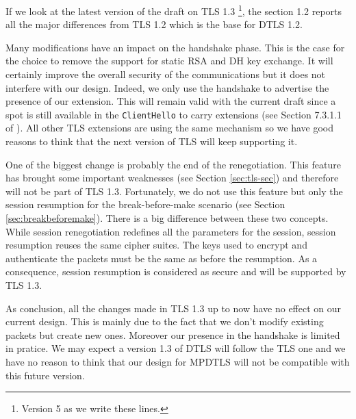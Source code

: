 If we look at the latest version of the draft on TLS 1.3 \cite{draft-tls13}\footnote{Version 5 as we write these lines.}, the section 1.2 reports all the major differences from TLS 1.2 which is the base for DTLS 1.2.

Many modifications have an impact on the handshake phase. This is the case for the choice to remove the support for static RSA and DH key exchange. It will certainly improve the overall security of the communications but it does not interfere with our design. Indeed, we only use the handshake to advertise the presence of our extension. This will remain valid with the current draft since a spot is still available in the \texttt{ClientHello} to carry extensions (see Section 7.3.1.1 of \cite{draft-tls13}). All other TLS extensions are using the same mechanism so we have good reasons to think that the next version of TLS will keep supporting it.

One of the biggest change is probably the end of the renegotiation. This feature has brought some important weaknesses (see Section \ref{sec:tls-sec}) and therefore will not be part of TLS 1.3. Fortunately, we do not use this feature but only the session resumption for the break-before-make scenario (see Section \ref{sec:breakbeforemake}). There is a big difference between these two concepts. While session renegotiation redefines all the parameters for the session, session resumption reuses the same cipher suites. The keys used to encrypt and authenticate the packets must be the same as before the resumption. As a consequence, session resumption is considered as secure and will be supported by TLS 1.3.

As conclusion, all the changes made in TLS 1.3 up to now have no effect on our current design. This is mainly due to the fact that we don't modify existing packets but create new ones. Moreover our presence in the handshake is limited in pratice. We may expect a version 1.3 of DTLS will follow the TLS one and we have no reason to think that our design for MPDTLS will not be compatible with this future version.